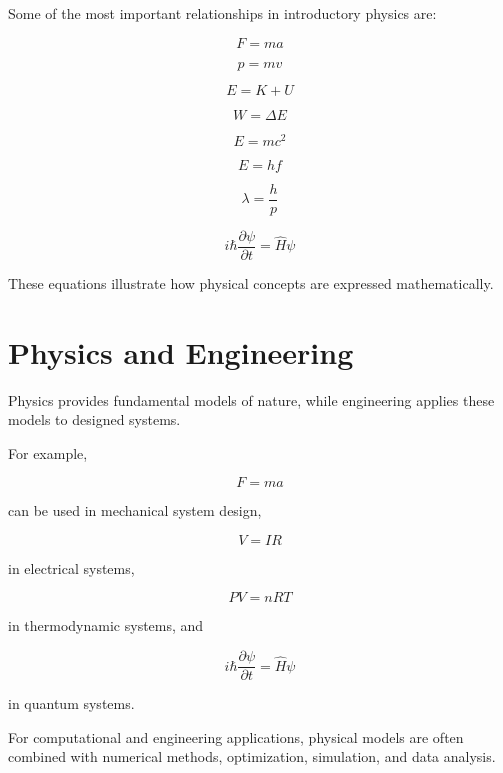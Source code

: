 \documentclass[11pt,a4paper]{article}
\begin{document}
Some of the most important relationships in introductory physics are:

\[
\boxed{F=ma}
\]

\[
\boxed{p=mv}
\]

\[
\boxed{E=K+U}
\]

\[
\boxed{W=\Delta E}
\]

\[
\boxed{E=mc^2}
\]

\[
\boxed{E=hf}
\]

\[
\boxed{\lambda=\frac{h}{p}}
\]

\[
\boxed{
i\hbar\frac{\partial\psi}{\partial t}
=
\hat H\psi
}
\]

These equations illustrate how physical concepts are expressed mathematically.

\section{Physics and Engineering}

Physics provides fundamental models of nature, while engineering applies these models to designed systems.

For example,

\[
F=ma
\]

can be used in mechanical system design,

\[
V=IR
\]

in electrical systems,

\[
PV=nRT
\]

in thermodynamic systems, and

\[
i\hbar\frac{\partial\psi}{\partial t}
=
\hat H\psi
\]

in quantum systems.

For computational and engineering applications, physical models are often combined with numerical methods, optimization, simulation, and data analysis.

\end{document}
